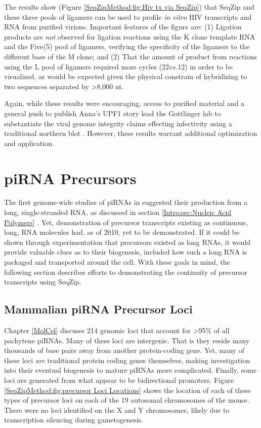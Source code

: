     The results show (Figure \ref{SeqZipMethod:fig:Hiv tx via SeqZip}) that SeqZip and these three pools of ligamers can be used to profile \textit{in vitro} HIV transcripts and RNA from purified virions. Important features of the figure are: (1) Ligation products are \textit{not} observed for ligation reactions using the K clone template RNA and the Five(5) pool of ligamers, verifying the specificity of the ligamers to the different base of the M clone; and (2) That the amount of product from reactions using the L pool of ligamers required more cycles (22$vs.$12) in order to be visualized, as would be expected given the physical constrain of hybridizing to two sequences separated by >8,000 nt. 

    Again, while these results were encouraging, access to purified material and a general push to publish Anna's UPF1 story lead the Gottlinger lab to substantiate the viral genome integrity claims effecting infectivity using a traditional northern blot \citep{Serquina2013}. However, these results warrant additional optimization and application.

\section{piRNA Precursors}
  \label{SeqZipMethod:sec:Demonstrating continuous precursor TX by SeqZip}

  The first genome-wide studies of piRNAs in \flies{} suggested their production from a long, single-stranded RNA, as discussed in section \ref{Intro:sec:Nucleic Acid Polymers} \citep{Brennecke2007,Gunawardane2007}. Yet, demonstration of precursor transcripts existing as continuous, long, RNA molecules had, as of 2010, yet to be demonstrated. If it could be shown through experimentation that precursors existed as long RNAs, it would provide valuable clues as to their biogenesis, included how such a long RNA is packaged and transported around the cell. With these goals in mind, the following section describes efforts to demonstrating the continuity of precursor transcripts using SeqZip.

  \subsection{Mammalian piRNA Precursor Loci}
    \label{SeqZipMethod:subsec:Mammalian Loci of precursor Tx}

    Chapter \ref{MolCel} discuses 214 genomic loci that account for >95\% of all pachytene piRNAs. Many of these loci are intergenic. That is they reside many thousands of base pairs away from another protein-coding gene. Yet, many of these loci \textit{are} traditional protein coding genes themselves, making investigation into their eventual biogenesis to mature piRNAs more complicated. Finally, some loci are generated from what appear to be bidirectional promoters. Figure \ref{SeqZipMethod:fig:precursor Loci Locations} shows the location of each of these types of precursor loci on each of the 19 autosomal chromosomes of the mouse. There were no loci identified on the X and Y chromosomes, likely due to transcription silencing during gametogenesis. 

